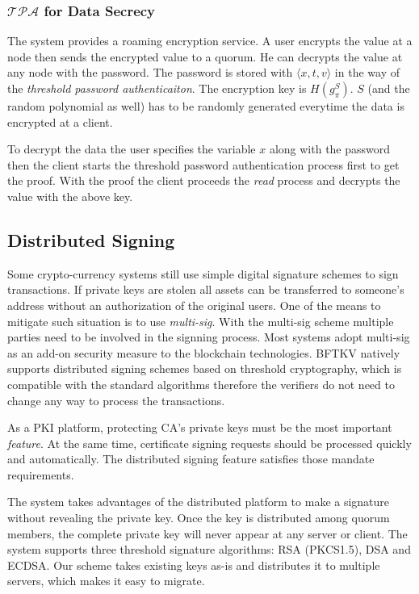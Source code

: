 \subsubsection*{$\mathcal{TPA}$ for Data Secrecy}
The system provides a roaming encryption service. A user encrypts
the value at a node then sends the encrypted value to a quorum. He can
decrypts the value at any node with the password. The password is
stored with $\langle x, t, v \rangle$ in the way of the {\em threshold
password authenticaiton}. The encryption key is $H(g_{\pi}^S)$. $S$
(and the random polynomial as well) has to be randomly generated
everytime the data is encrypted at a client.

To decrypt the data the user specifies the variable $x$ along with the
password then the client starts the threshold password authentication
process first to get the proof. With the proof the client proceeds the
{\em read} process and decrypts the value with the above key.

\subsection{Distributed Signing}
Some crypto-currency systems still use simple digital signature
schemes to sign transactions. If private keys are stolen all assets
can be transferred to someone's address without an authorization of
the original users. One of the means to mitigate such situation is to
use {\em multi-sig}. With the multi-sig scheme multiple parties need
to be involved in the signning process. Most systems adopt multi-sig
as an add-on security measure to the blockchain technologies. BFTKV
natively supports distributed signing schemes based on threshold
cryptography, which is compatible with the standard algorithms
therefore the verifiers do not need to change any way to process the
transactions.

As a PKI platform, protecting CA's private keys must be the most
important {\em feature}. At the same time, certificate signing
requests should be processed quickly and automatically. The
distributed signing feature satisfies those mandate requirements.

The system takes advantages of the distributed platform to make a
signature without revealing the private key. Once the key is
distributed among quorum members, the complete private key will never
appear at any server or client. The system supports three threshold
signature algorithms: RSA (PKCS1.5), DSA and ECDSA. Our scheme takes
existing keys as-is and distributes it to multiple servers, which
makes it easy to migrate.


